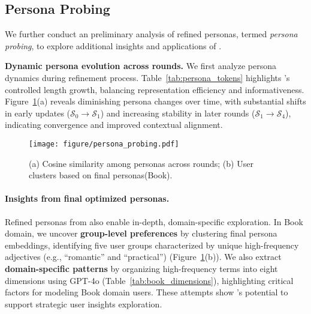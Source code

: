 \subsection{Persona Probing}
We further conduct an preliminary analysis of refined personas, termed \textit{persona probing}, to explore additional insights and applications of \method.



\noindent
\textbf{Dynamic persona evolution across rounds.}
We first analyze persona dynamics during refinement process. Table~\ref{tab:persona_tokens} highlights \method’s controlled length growth, balancing representation efficiency and informativeness. Figure~\ref{fig:persona_probing}(a) reveals diminishing persona changes over time, with substantial shifts in early updates ($\mathcal{S}_0 \to \mathcal{S}_1$) and increasing stability in later rounds ($\mathcal{S}_1 \to \mathcal{S}_4$), indicating convergence and improved contextual alignment.

\begin{figure}[h]
    \centering
    \texttt{[image: figure/persona\_probing.pdf]}
    \caption{(a) Cosine similarity among personas across rounds; (b) User clusters based on final personas(Book).}
    \label{fig:persona_probing}
\end{figure}




\paragraph{Insights from final optimized personas.} 
Refined personas from \method also enable in-depth, domain-specific exploration. 
In Book domain, we uncover \textbf{group-level preferences} by clustering final persona embeddings, identifying five user groups characterized by unique high-frequency adjectives (e.g., “romantic” and “practical”) (Figure~\ref{fig:persona_probing}(b)). 
We also extract \textbf{domain-specific patterns} by organizing high-frequency terms into eight dimensions using GPT-4o (Table~\ref{tab:book_dimensions}), highlighting critical factors for modeling Book domain users. These attempts show \method’s potential to support strategic user insights exploration.

